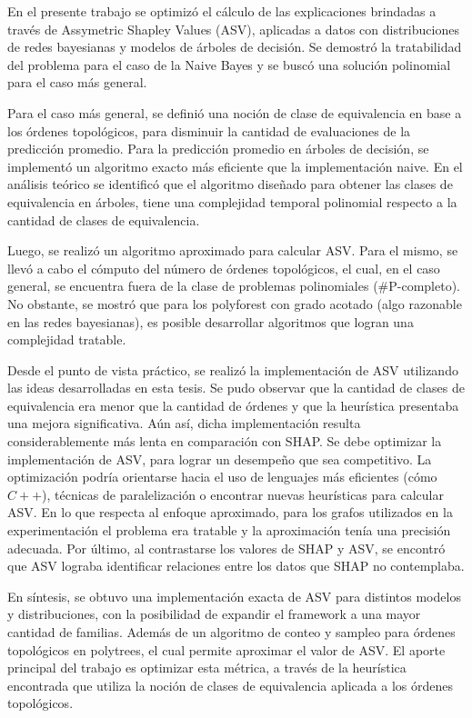 En el presente trabajo se optimizó el cálculo de las explicaciones brindadas a través de Assymetric Shapley Values (ASV), aplicadas a datos con distribuciones de redes bayesianas y modelos de árboles de decisión. Se demostró la tratabilidad del problema para el caso de la Naive Bayes y se buscó una solución polinomial para el caso más general. 

Para el caso más general, se definió una noción de clase de equivalencia en base a los órdenes topológicos, para disminuir la cantidad de evaluaciones de la predicción promedio. Para la predicción promedio en árboles de decisión, se implementó un algoritmo exacto más eficiente que la implementación naive. En el análisis teórico se identificó que el algoritmo diseñado para obtener las clases de equivalencia en árboles, tiene una complejidad temporal polinomial respecto a la cantidad de clases de equivalencia. 

Luego, se realizó un algoritmo aproximado para calcular ASV. Para el mismo, se llevó a cabo el cómputo del número de órdenes topológicos, el cual, en el caso general, se encuentra fuera de la clase de problemas polinomiales (\#P-completo). No obstante, se mostró que para los polyforest con grado acotado (algo razonable en las redes bayesianas), es posible desarrollar algoritmos que logran una complejidad tratable. 

Desde el punto de vista práctico, se realizó la implementación de ASV utilizando las ideas desarrolladas en esta tesis. Se pudo observar que la cantidad de clases de equivalencia era  menor que la cantidad de órdenes y que la heurística presentaba una mejora significativa. Aún así, dicha implementación resulta considerablemente más lenta en comparación con SHAP. Se debe optimizar la implementación de ASV, para lograr un desempeño que sea competitivo. La optimización podría orientarse hacia el uso de lenguajes más eficientes (cómo $C++$), técnicas de paralelización o encontrar nuevas heurísticas para calcular ASV. En lo que respecta al enfoque aproximado, para los grafos utilizados en la experimentación el problema era tratable y la aproximación tenía una precisión adecuada. Por último, al contrastarse los valores de SHAP y ASV, se encontró que ASV lograba identificar relaciones entre los datos que SHAP no contemplaba. 

En síntesis, se obtuvo una implementación exacta de ASV para distintos modelos y distribuciones, con la posibilidad de expandir el framework a una mayor cantidad de familias. Además de un algoritmo de conteo y sampleo para órdenes topológicos en polytrees, el cual permite aproximar el valor de ASV. El aporte principal del trabajo es optimizar esta métrica, a través de la heurística encontrada que utiliza la noción de clases de equivalencia aplicada a los órdenes topológicos. 


